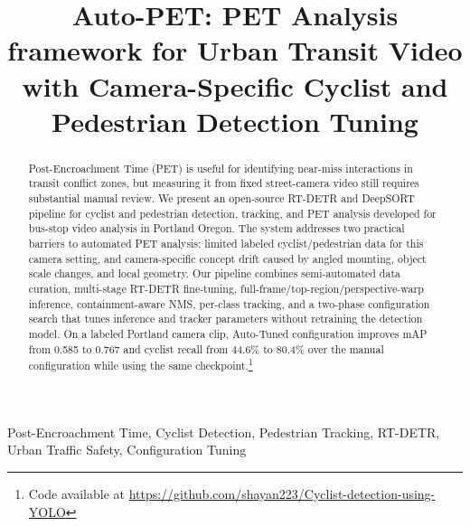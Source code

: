 \documentclass[conference]{IEEEtran}
\begin{document}
\title{Auto-PET: PET Analysis framework for Urban Transit Video with Camera-Specific Cyclist and Pedestrian Detection Tuning}

\author{
\and
{}
}

\maketitle

\begin{abstract}
Post-Encroachment Time (PET) is useful for identifying near-miss interactions in transit conflict zones, but measuring it from fixed street-camera video still requires substantial manual review. We present an open-source RT-DETR and DeepSORT pipeline for cyclist and pedestrian detection, tracking, and PET analysis developed for bus-stop video analysis in Portland Oregon. The system addresses two practical barriers to automated PET analysis: limited labeled cyclist/pedestrian data for this camera setting, and camera-specific concept drift caused by angled mounting, object scale changes, and local geometry. Our pipeline combines semi-automated data curation, multi-stage RT-DETR fine-tuning, full-frame/top-region/perspective-warp inference, containment-aware NMS, per-class tracking, and a two-phase configuration search that tunes inference and tracker parameters without retraining the detection model. On a labeled Portland camera clip, Auto-Tuned configuration improves mAP from 0.585 to 0.767 and cyclist recall from 44.6\% to 80.4\% over the manual configuration while using the same checkpoint.\footnote{Code available at \url{https://github.com/shayan223/Cyclist-detection-using-YOLO}}
\end{abstract}

\begin{IEEEkeywords}
Post-Encroachment Time, Cyclist Detection, Pedestrian Tracking, RT-DETR, Urban Traffic Safety, Configuration Tuning
\end{IEEEkeywords}
\end{document}
